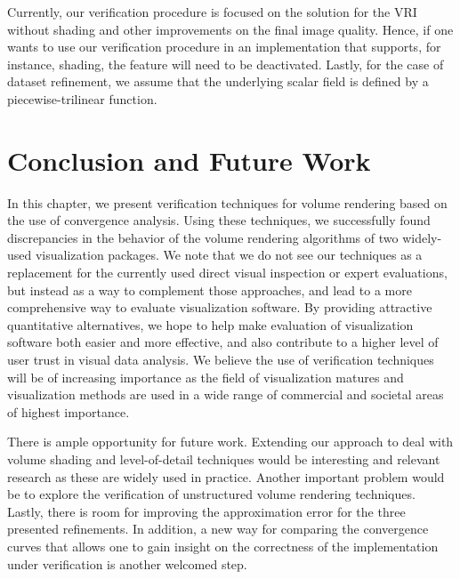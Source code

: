 Currently, our verification procedure is focused on the solution for
the VRI without shading and other improvements on the final image
quality. Hence, if one wants to use our verification procedure in an
implementation that supports, for instance, shading, the feature will
need to be deactivated. Lastly, for the case of dataset refinement, we
assume that the underlying scalar field is defined by a piecewise-trilinear
function.

\section{Conclusion and Future Work}
\label{sec:conclusion}

In this chapter, we present verification techniques for volume rendering
based on the use of convergence analysis. Using these techniques, we
successfully found discrepancies in the behavior of the volume
rendering algorithms of two widely-used visualization packages.  We
note that we do not see our techniques as a replacement for the
currently used direct visual inspection or expert evaluations, but
instead as a way to complement those approaches, and lead to a more
comprehensive way to evaluate visualization software.  By providing
attractive quantitative alternatives, we hope to help make evaluation
of visualization software both easier and more effective, and also
contribute to a higher level of user trust in visual data analysis. We
believe the use of verification techniques will be of increasing
importance as the field of visualization matures and visualization
methods are used in a wide range of commercial and societal areas of
highest importance.

There is ample opportunity for future work. Extending our approach to
deal with volume shading and level-of-detail techniques would be
interesting and relevant research as these are widely used in
practice. Another important problem would be to explore the
verification of unstructured volume rendering techniques. Lastly,
there is room for improving the approximation error for
the three presented refinements. In addition, a new way for comparing
the convergence curves that allows one to gain insight on the
correctness of the implementation under verification is another
welcomed step.
